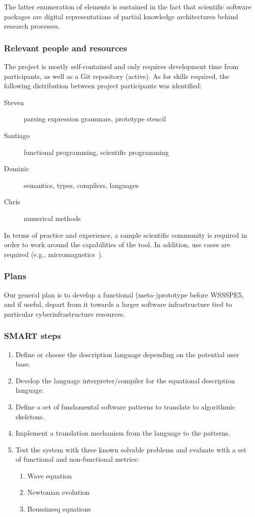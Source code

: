 The latter enumeration of elements is sustained in the fact that scientific
software packages are digital representations of partial knowledge architectures
behind research processes.

\subsubsection{Relevant people and resources}

The project is mostly self-contained and only requires development time from
participants, as well as a Git repository (active). As for skills required, the
following distribution between project participants was identified:

\begin{description}
  \item[Steven] parsing expression grammars, prototype stencil
  \item[Santiago] functional programming, scientific programming
  \item[Dominic] semantics, types, compilers, languages
  \item[Chris] numerical methods
\end{description}

In terms of practice and experience, a sample scientific community is required
in order to work around the capabilities of the tool. In addition, use cases
are required (e.g., micromagnetics~\cite{fischbacher2007systematic}).

\subsubsection{Plans}

Our general plan is to develop a functional (meta-)prototype before WSSSPE5, and
if useful, depart from it towards a larger software infrastructure tied to
particular cyberinfrastructure resources.

\subsubsection{SMART steps}

\begin{enumerate}
  \item Define or choose the description language depending on the potential user
  base.
  \item Develop the language interpreter/compiler for the equational description
  language.
  \item Define a set of fundamental software patterns to translate to algorithmic
  skeletons.
  \item Implement a translation mechanism from the language to the patterns.
  \item Test the system with three known solvable problems and evaluate with a
  set of functional and non-functional metrics:
  \begin{enumerate}
    \item Wave equation
    \item Newtonian evolution
    \item Boussinesq equations
  \end{enumerate}
\end{enumerate}

